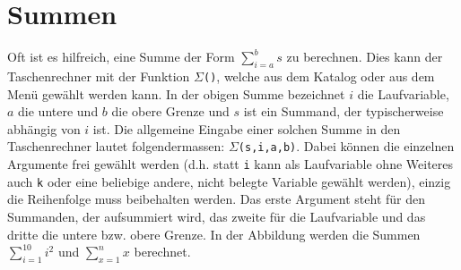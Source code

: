 \documentclass[a4paper,11pt,notitlepage,halfparskip,headsepline,normalheadings,twoside]{scrartcl}
\newlength{\tikey}
\newcommand{\keystroke}[1]{\settowidth{\tikey}{\scriptsize #1}\psframebox[framearc=0.2]{\parbox{\tikey}{\scriptsize\textsf{#1}}}}
\begin{document}
\section{Summen}
\begin{window}
Oft ist es hilfreich, eine Summe der Form $ \sum_{i=a}^b s$
zu berechnen. Dies kann der Taschenrechner mit der Funktion \texttt{$\Sigma$()},
welche aus dem Katalog oder aus dem Menü \keystroke{F3} gewählt werden kann. In
der obigen Summe bezeichnet $i$ die Laufvariable, $a$ die untere und $b$
die obere Grenze und $s$ ist ein Summand, der typischerweise abhängig von $i$
ist. Die allgemeine Eingabe einer solchen Summe in den Taschenrechner lautet
folgendermassen: \texttt{$\Sigma$(s,i,a,b)}. Dabei können die einzelnen
Argumente frei gewählt werden (d.h. statt \texttt{i} kann als Laufvariable
ohne Weiteres auch \texttt{k} oder eine beliebige andere, nicht belegte Variable
gewählt werden), einzig die Reihenfolge muss beibehalten werden. Das erste
Argument steht für den Summanden, der aufsummiert wird, das zweite für die
Laufvariable und das dritte die untere bzw. obere Grenze. In der Abbildung
werden die Summen $\sum_{i=1}^{10} i^2$ und $\sum_{x=1}^n x$ berechnet.
\end{window}
\end{document}
